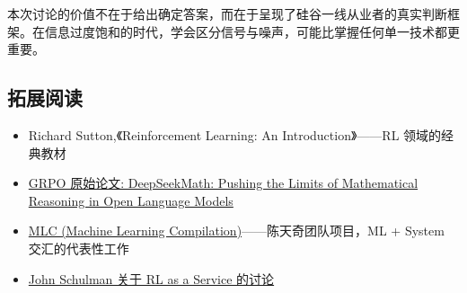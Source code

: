 \vspace{1em}
\noindent 本次讨论的价值不在于给出确定答案，而在于呈现了硅谷一线从业者的真实判断框架。在信息过度饱和的时代，学会区分信号与噪声，可能比掌握任何单一技术都更重要。

\subsection{拓展阅读}

\begin{itemize}
    \item Richard Sutton,《Reinforcement Learning: An Introduction》——RL 领域的经典教材
    \item \href{https://arxiv.org/abs/2402.03300}{GRPO 原始论文: DeepSeekMath: Pushing the Limits of Mathematical Reasoning in Open Language Models}
    \item \href{https://mlc.ai/}{MLC (Machine Learning Compilation)}——陈天奇团队项目，ML + System 交汇的代表性工作
    \item \href{https://www.youtube.com/watch?v=2TvQebfBsNk}{John Schulman 关于 RL as a Service 的讨论}
\end{itemize}


